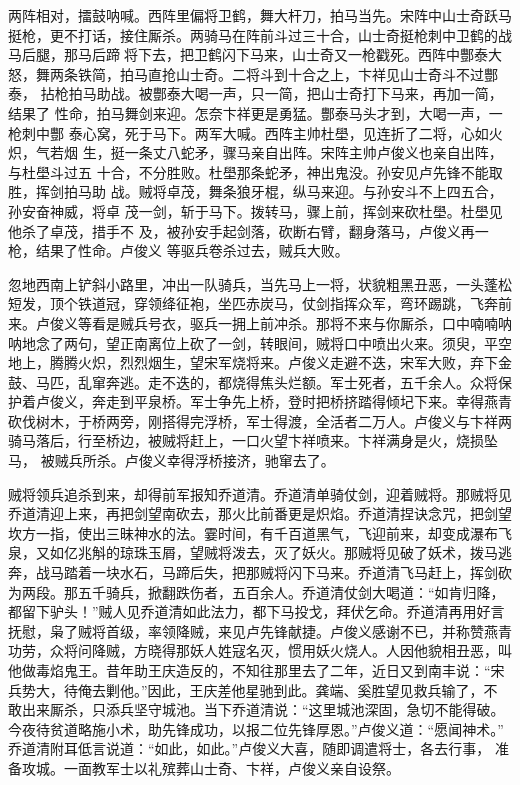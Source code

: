 两阵相对，擂鼓呐喊。西阵里偏将卫鹤，舞大杆刀，拍马当先。宋阵中山士奇跃马
挺枪，更不打话，接住厮杀。两骑马在阵前斗过三十合，山士奇挺枪刺中卫鹤的战
马后腿，那马后蹄将下去，把卫鹤闪下马来，山士奇又一枪戳死。西阵中酆泰大
怒，舞两条铁简，拍马直抢山士奇。二将斗到十合之上，卞祥见山士奇斗不过酆泰，
拈枪拍马助战。被酆泰大喝一声，只一简，把山士奇打下马来，再加一简，结果了
性命，拍马舞剑来迎。怎奈卞祥更是勇猛。酆泰马头才到，大喝一声，一枪刺中酆
泰心窝，死于马下。两军大喊。西阵主帅杜壆，见连折了二将，心如火炽，气若烟
生，挺一条丈八蛇矛，骤马亲自出阵。宋阵主帅卢俊义也亲自出阵，与杜壆斗过五
十合，不分胜败。杜壆那条蛇矛，神出鬼没。孙安见卢先锋不能取胜，挥剑拍马助
战。贼将卓茂，舞条狼牙棍，纵马来迎。与孙安斗不上四五合，孙安奋神威，将卓
茂一剑，斩于马下。拨转马，骤上前，挥剑来砍杜壆。杜壆见他杀了卓茂，措手不
及，被孙安手起剑落，砍断右臂，翻身落马，卢俊义再一枪，结果了性命。卢俊义
等驱兵卷杀过去，贼兵大败。

忽地西南上铲斜小路里，冲出一队骑兵，当先马上一将，状貌粗黑丑恶，一头蓬松
短发，顶个铁道冠，穿领绛征袍，坐匹赤炭马，仗剑指挥众军，弯环踢跳，飞奔前
来。卢俊义等看是贼兵号衣，驱兵一拥上前冲杀。那将不来与你厮杀，口中喃喃呐
呐地念了两句，望正南离位上砍了一剑，转眼间，贼将口中喷出火来。须臾，平空
地上，腾腾火炽，烈烈烟生，望宋军烧将来。卢俊义走避不迭，宋军大败，弃下金
鼓、马匹，乱窜奔逃。走不迭的，都烧得焦头烂额。军士死者，五千余人。众将保
护着卢俊义，奔走到平泉桥。军士争先上桥，登时把桥挤踏得倾圮下来。幸得燕青
砍伐树木，于桥两旁，刚搭得完浮桥，军士得渡，全活者二万人。卢俊义与卞祥两
骑马落后，行至桥边，被贼将赶上，一口火望卞祥喷来。卞祥满身是火，烧损坠马，
被贼兵所杀。卢俊义幸得浮桥接济，驰窜去了。

贼将领兵追杀到来，却得前军报知乔道清。乔道清单骑仗剑，迎着贼将。那贼将见
乔道清迎上来，再把剑望南砍去，那火比前番更是炽焰。乔道清捏诀念咒，把剑望
坎方一指，使出三昧神水的法。霎时间，有千百道黑气，飞迎前来，却变成瀑布飞
泉，又如亿兆斛的琼珠玉屑，望贼将泼去，灭了妖火。那贼将见破了妖术，拨马逃
奔，战马踏着一块水石，马蹄后失，把那贼将闪下马来。乔道清飞马赶上，挥剑砍
为两段。那五千骑兵，掀翻跌伤者，五百余人。乔道清仗剑大喝道：“如肯归降，
都留下驴头！”贼人见乔道清如此法力，都下马投戈，拜伏乞命。乔道清再用好言
抚慰，枭了贼将首级，率领降贼，来见卢先锋献捷。卢俊义感谢不已，并称赞燕青
功劳，众将问降贼，方晓得那妖人姓寇名灭，惯用妖火烧人。人因他貌相丑恶，叫
他做毒焰鬼王。昔年助王庆造反的，不知往那里去了二年，近日又到南丰说：“宋
兵势大，待俺去剿他。”因此，王庆差他星驰到此。龚端、奚胜望见救兵输了，不
敢出来厮杀，只添兵坚守城池。当下乔道清说：“这里城池深固，急切不能得破。
今夜待贫道略施小术，助先锋成功，以报二位先锋厚恩。”卢俊义道：“愿闻神术。”
乔道清附耳低言说道：“如此，如此。”卢俊义大喜，随即调遣将士，各去行事，
准备攻城。一面教军士以礼殡葬山士奇、卞祥，卢俊义亲自设祭。

